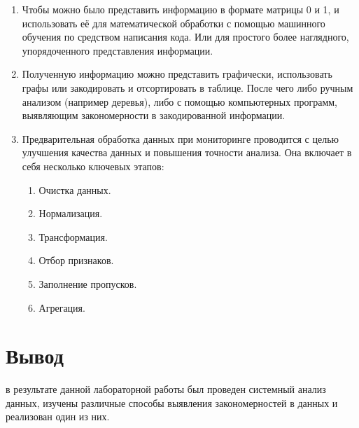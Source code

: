 \documentclass[a4paper, 12pt]{article}
\begin{document}
\begin{enumerate}
\begin{enumerate}
  \end{enumerate}
  \item Чтобы можно было представить информацию в формате матрицы
  0 и 1, и использовать её для математической обработки с помощью
  машинного обучения по средством написания кода. Или для простого
  более наглядного, упорядоченного представления информации.
  \item Полученную информацию можно представить графически,
  использовать графы или закодировать и отсортировать в таблице. После
  чего либо ручным анализом (например деревья), либо с помощью
  компьютерных программ, выявляющим закономерности в
  закодированной информации.
  \item Предварительная обработка данных при мониторинге проводится с целью улучшения качества данных и повышения точности анализа. Она включает в себя несколько ключевых этапов: 
  \begin{enumerate}
    \item Очистка данных.
    \item Нормализация.
    \item Трансформация.
    \item Отбор признаков.
    \item Заполнение пропусков.
    \item Агрегация.
  \end{enumerate}
\end{enumerate}
\newpage
\section{Вывод}
в результате данной лабораторной работы был проведен
системный анализ данных, изучены различные способы выявления
закономерностей в данных и реализован один из них.
\end{document}
